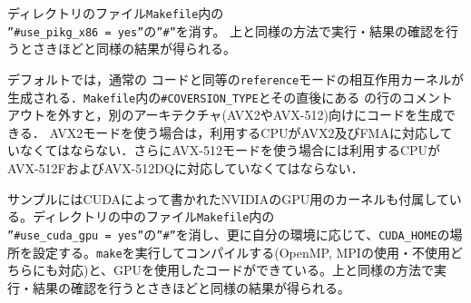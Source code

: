 ディレクトリ\dirNameNbodySample のファイル\texttt{Makefile}内の\texttt{\\''\#use\_pikg\_x86 = yes''}の\texttt{''\#''}を消す。
上と同様の方法で実行・結果の確認を行うとさきほどと同様の結果が得られる。

デフォルトでは，通常の \progLangName コードと同等の\texttt{reference}モードの相互作用カーネルが生成される．\texttt{Makefile}内の\texttt{\#COVERSION\_TYPE}とその直後にある
の行のコメントアウトを外すと，別のアーキテクチャ(AVX2やAVX-512)向けにコードを生成できる．
AVX2モードを使う場合は，利用するCPUがAVX2及びFMAに対応していなくてはならない．さらにAVX-512モードを使う場合には利用するCPUがAVX-512FおよびAVX-512DQに対応していなくてはならない．

\ifCpp %
\label{sec:use_nvidia_gpu}
サンプルにはCUDAによって書かれたNVIDIAのGPU用のカーネルも付属している。ディレクトリ\dirNameNbodySample の中のファイル\texttt{Makefile}内の\texttt{\\''\#use\_cuda\_gpu = yes''}の\texttt{''\#''}を消し、更に自分の環境に応じて、\texttt{CUDA\_HOME}の場所を設定する。\texttt{make}を実行してコンパイルする(OpenMP, MPIの使用・不使用どちらにも対応)と、GPUを使用したコードができている。上と同様の方法で実行・結果の確認を行うとさきほどと同様の結果が得られる。
\endifCpp

